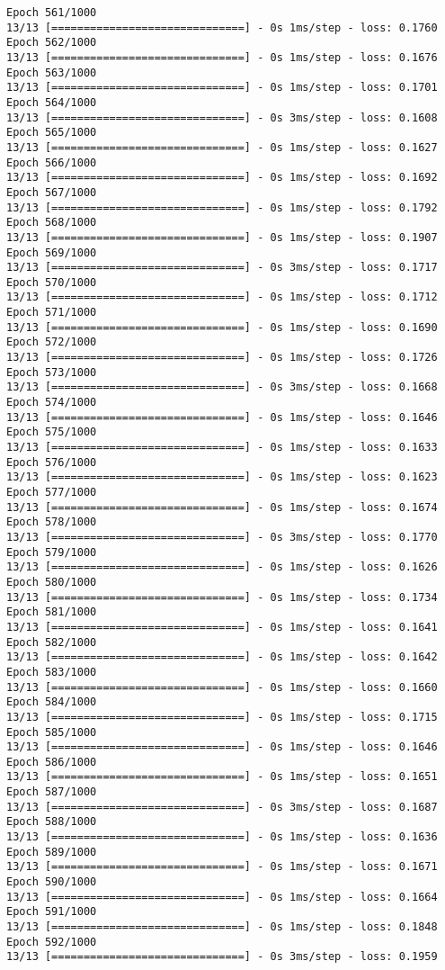 \documentclass[11pt]{article}
\begin{document}
\begin{Verbatim}[commandchars=\\\{\}]
Epoch 561/1000
13/13 [==============================] - 0s 1ms/step - loss: 0.1760
Epoch 562/1000
13/13 [==============================] - 0s 1ms/step - loss: 0.1676
Epoch 563/1000
13/13 [==============================] - 0s 1ms/step - loss: 0.1701
Epoch 564/1000
13/13 [==============================] - 0s 3ms/step - loss: 0.1608
Epoch 565/1000
13/13 [==============================] - 0s 1ms/step - loss: 0.1627
Epoch 566/1000
13/13 [==============================] - 0s 1ms/step - loss: 0.1692
Epoch 567/1000
13/13 [==============================] - 0s 1ms/step - loss: 0.1792
Epoch 568/1000
13/13 [==============================] - 0s 1ms/step - loss: 0.1907
Epoch 569/1000
13/13 [==============================] - 0s 3ms/step - loss: 0.1717
Epoch 570/1000
13/13 [==============================] - 0s 1ms/step - loss: 0.1712
Epoch 571/1000
13/13 [==============================] - 0s 1ms/step - loss: 0.1690
Epoch 572/1000
13/13 [==============================] - 0s 1ms/step - loss: 0.1726
Epoch 573/1000
13/13 [==============================] - 0s 3ms/step - loss: 0.1668
Epoch 574/1000
13/13 [==============================] - 0s 1ms/step - loss: 0.1646
Epoch 575/1000
13/13 [==============================] - 0s 1ms/step - loss: 0.1633
Epoch 576/1000
13/13 [==============================] - 0s 1ms/step - loss: 0.1623
Epoch 577/1000
13/13 [==============================] - 0s 1ms/step - loss: 0.1674
Epoch 578/1000
13/13 [==============================] - 0s 3ms/step - loss: 0.1770
Epoch 579/1000
13/13 [==============================] - 0s 1ms/step - loss: 0.1626
Epoch 580/1000
13/13 [==============================] - 0s 1ms/step - loss: 0.1734
Epoch 581/1000
13/13 [==============================] - 0s 1ms/step - loss: 0.1641
Epoch 582/1000
13/13 [==============================] - 0s 1ms/step - loss: 0.1642
Epoch 583/1000
13/13 [==============================] - 0s 1ms/step - loss: 0.1660
Epoch 584/1000
13/13 [==============================] - 0s 1ms/step - loss: 0.1715
Epoch 585/1000
13/13 [==============================] - 0s 1ms/step - loss: 0.1646
Epoch 586/1000
13/13 [==============================] - 0s 1ms/step - loss: 0.1651
Epoch 587/1000
13/13 [==============================] - 0s 3ms/step - loss: 0.1687
Epoch 588/1000
13/13 [==============================] - 0s 1ms/step - loss: 0.1636
Epoch 589/1000
13/13 [==============================] - 0s 1ms/step - loss: 0.1671
Epoch 590/1000
13/13 [==============================] - 0s 1ms/step - loss: 0.1664
Epoch 591/1000
13/13 [==============================] - 0s 1ms/step - loss: 0.1848
Epoch 592/1000
13/13 [==============================] - 0s 3ms/step - loss: 0.1959

\end{Verbatim}
\end{document}
